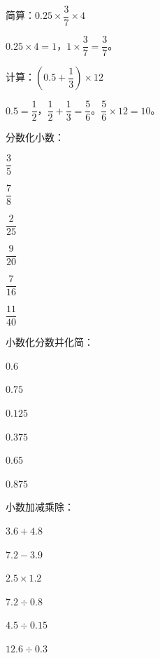 \begin{example}
简算：$0.25\times\dfrac{3}{7}\times4$
\end{example}
\begin{solution}
$0.25\times4 = 1$，$1\times\dfrac{3}{7} = \dfrac{3}{7}$。
\end{solution}

\begin{example}
计算：$\left(0.5+\dfrac{1}{3}\right)\times12$
\end{example}
\begin{solution}
$0.5 = \dfrac{1}{2}$，$\dfrac{1}{2}+\dfrac{1}{3} = \dfrac{5}{6}$。$\dfrac{5}{6}\times12 = 10$。
\end{solution}

\begin{exercise}
\item 分数化小数：
  \begin{subexercise}
    \item $\dfrac{3}{5}$
    \item $\dfrac{7}{8}$
    \item $\dfrac{2}{25}$
    \item $\dfrac{9}{20}$
    \item $\dfrac{7}{16}$
    \item $\dfrac{11}{40}$
  \end{subexercise}

\item 小数化分数并化简：
  \begin{subexercise}
    \item $0.6$
    \item $0.75$
    \item $0.125$
    \item $0.375$
    \item $0.65$
    \item $0.875$
  \end{subexercise}

\item 小数加减乘除：
  \begin{subexercise}
    \item $3.6+4.8$
    \item $7.2-3.9$
    \item $2.5\times1.2$
    \item $7.2\div0.8$
    \item $4.5\div0.15$
    \item $12.6\div0.3$
  \end{subexercise}


\end{exercise}
